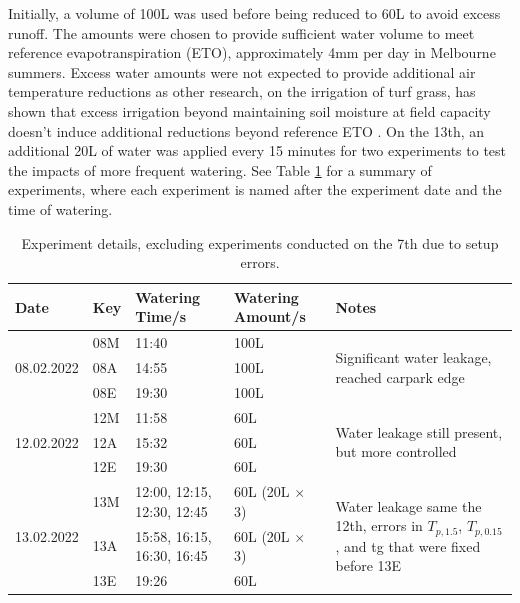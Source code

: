 \documentclass[final,3p,times,authoryear]{elsarticle}
\begin{document}
Initially, a volume of 100L was used before being reduced to 60L to avoid excess runoff. The amounts were chosen to provide sufficient water volume to meet reference evapotranspiration (ETO), approximately 4mm per day in Melbourne summers. Excess water amounts were not expected to provide additional air temperature reductions as other research, on the irrigation of turf grass, has shown that excess irrigation beyond maintaining soil moisture at field capacity doesn’t induce additional reductions beyond reference ETO \citep{Cheung2022b}. On the 13th, an additional 20L of water was applied every 15 minutes for two experiments to test the impacts of more frequent watering. See Table \ref{table:2.2} for a summary of experiments, where each experiment is named after the experiment date and the time of watering.

\begin{table}[!ht]\caption{Experiment details, excluding experiments conducted on the 7th due to setup errors.}
    \centering
    \begin{tabular}{|p{2.0cm}|p{3cm}|p{2.0cm}|p{2.0cm}|p{5cm}|}
    \hline
        Date & Key & Watering Time/s & Watering Amount/s & Notes \\ \hline
        \multirow{3}{2pt}{08.02.2022} & 08M & 11:40 & 100L & \multirow{3}{*}{\parbox{4cm}{Significant water leakage, reached carpark edge}} \\
         ~ & 08A & 14:55 & 100L & ~ \\ 
         ~ & 08E & 19:30 & 100L & ~ \\ \hline
         \multirow{3}{2pt}{12.02.2022} & 12M & 11:58 & 60L & \multirow{3}{*}{\parbox{4cm}{Water leakage still present, but more controlled}} \\
          ~ & 12A & 15:32 & 60L & ~ \\ 
          ~ & 12E & 19:30 & 60L & ~ \\ \hline
        \multirow{3}{2pt}{13.02.2022} & 13M & 12:00, 12:15, 12:30, 12:45 & 60L (20L $\times$ 3) & \multirow{3}{*}{\parbox{4cm}{Water leakage same the 12th, errors in $T_{p,1.5}$, $T_{p,0.15}$, and \gls{tg} that were fixed before 13E}} \\
         ~ & 13A & 15:58, 16:15, 16:30, 16:45 & 60L (20L $\times$ 3) & ~ \\ 
         ~ & 13E & 19:26 & 60L & ~ \\ \hline
    \end{tabular}\label{table:2.2}
\end{table}
\end{document}
